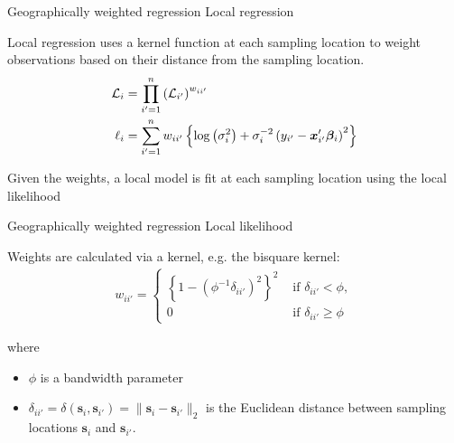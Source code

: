 \documentclass[12pt,t]{beamer}
\newcommand{\subt}[1]{{\footnotesize \color{subtitle} {#1}}}
\begin{document}
\begin{frame}{Geographically weighted regression}
\subt{Local regression \citep{Loader:1999}}

\bigskip
Local regression uses a kernel function at each sampling location to weight observations based on their distance from the sampling location.
\begin{align}
    \mathcal{L}_i &= \prod_{i'=1}^n \left(\mathcal{L}_{i'}\right)^{w_{ii'}} \notag \\
    \ell_i &= \sum_{i'=1}^n w_{ii'} \left\{\log \left(\sigma_i^2\right) + \sigma_i^{-2}\left(y_{i'} - \bm{x}_{i'}'\bm{\beta}_i\right)^2 \right\} \notag
\end{align}

Given the weights, a local model is fit at each sampling location using the local likelihood

\end{frame}







\begin{frame}{Geographically weighted regression}
\subt{Local likelihood \citep{Loader:1999}}

\bigskip
Weights are calculated via a kernel, e.g. the bisquare kernel:
\begin{align}
	w_{ii'} = \begin{cases} \left\{1-\left(\phi^{-1}\delta_{ii'}\right)^2\right\}^2 &\mbox{ if } \delta_{ii'} < \phi, \\ 0 &\mbox{ if } \delta_{ii'} \geq \phi \end{cases}
\end{align}

where
\begin{itemize}
  \item $\phi$ is a bandwidth parameter
  \item $\delta_{ii'} = \delta(\bm{s}_i,\bm{s}_{i'}) = \|\bm{s}_i - \bm{s}_{i'}\|_2$ is the Euclidean distance between sampling locations $\bm{s}_i$ and $\bm{s}_{i'}$.
\end{itemize}

\end{frame}
\end{document}
